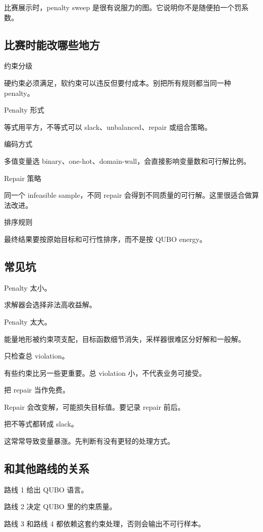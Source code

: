 \documentclass[UTF8,12pt,a4paper]{ctexart}
\begin{document}
比赛展示时，penalty sweep 是很有说服力的图。它说明你不是随便拍一个罚系数。

\subsection*{比赛时能改哪些地方}

约束分级

硬约束必须满足，软约束可以违反但要付成本。别把所有规则都当同一种 penalty。

Penalty 形式

等式用平方，不等式可以 slack、unbalanced、repair 或组合策略。

编码方式

多值变量选 binary、one-hot、domain-wall，会直接影响变量数和可行解比例。

Repair 策略

同一个 infeasible sample，不同 repair 会得到不同质量的可行解。这里很适合做算法改进。

排序规则

最终结果要按原始目标和可行性排序，而不是按 QUBO energy。

\subsection*{常见坑}

Penalty 太小。

求解器会选择非法高收益解。

Penalty 太大。

能量地形被约束项支配，目标函数细节消失，采样器很难区分好解和一般解。

只检查总 violation。

有些约束比另一些更重要。总 violation 小，不代表业务可接受。

把 repair 当作免费。

Repair 会改变解，可能损失目标值。要记录 repair 前后。

把不等式都转成 slack。

这常常导致变量暴涨。先判断有没有更轻的处理方式。

\subsection*{和其他路线的关系}

路线 1 给出 QUBO 语言。

路线 2 决定 QUBO 里的约束质量。

路线 3 和路线 4 都依赖这套约束处理，否则会输出不可行样本。
\end{document}
